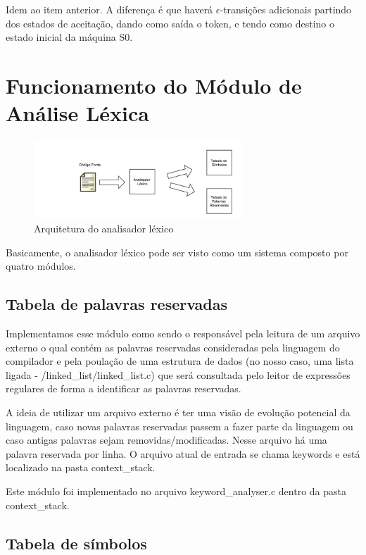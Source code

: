 \documentclass[
	article,			%
	11pt,				%
	oneside,			%
	a4paper,			%
	english,			%
	brazil,				%
	]{abntex2}
\begin{document}
Idem ao item anterior. A diferença é que haverá $\epsilon$-transições adicionais partindo dos estados de aceitação, dando como saída o token, e tendo como destino o estado inicial da máquina S0.

\section{Funcionamento do Módulo de Análise Léxica}

\begin{figure}[H]
  \caption{Arquitetura do analisador léxico}
  \centering
    \includegraphics[width=0.7\textwidth]{automatos/lexical_analyzer}
\end{figure}

Basicamente, o analisador léxico pode ser visto como um sistema composto por quatro módulos.

\subsection{Tabela de palavras reservadas}

Implementamos esse módulo como sendo o responsável pela leitura de um arquivo externo o qual contém as palavras reservadas consideradas pela linguagem do compilador e pela poulação de uma estrutura de dados (no nosso caso, uma lista ligada - /linked\_list/linked\_list.c) que será consultada pelo leitor de expressões regulares de forma a identificar as palavras reservadas.

A ideia de utilizar um arquivo externo é ter uma visão de evolução potencial da linguagem, caso novas palavras reservadas passem a fazer parte da linguagem ou caso antigas palavras sejam removidas/modificadas. Nesse arquivo há uma palavra reservada por linha. O arquivo atual de entrada se chama keywords e está localizado na pasta context\_stack.

Este módulo foi implementado no arquivo keyword\_analyser.c dentro da pasta context\_stack.

\subsection{Tabela de símbolos}
\end{document}
